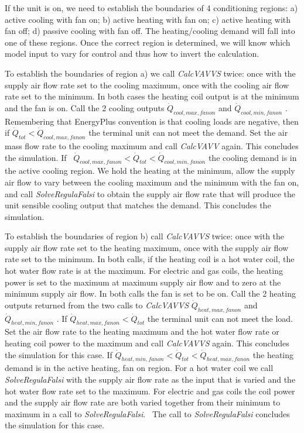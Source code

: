 If the unit is on, we need to establish the boundaries of 4 conditioning regions: a) active cooling with fan on; b) active heating with fan on; c) active heating with fan off; d) passive cooling with fan off. The heating/cooling demand will fall into one of these regions. Once the correct region is determined, we will know which model input to vary for control and thus how to invert the calculation.

To establish the boundaries of region a) we call \emph{CalcVAVVS} twice: once with the supply air flow rate set to the cooling maximum, once with the cooling air flow rate set to the minimum. In both cases the heating coil output is at the minimum and the fan is on. Call the 2 cooling outputs \({\dot Q_{cool,max,fanon}}\) and \({\dot Q_{cool,min,fanon}}\) . Remembering that EnergyPlus convention is that cooling loads are negative, then if \({\dot Q_{tot}} < {\dot Q_{cool,max,fanon}}\) the terminal unit can not meet the demand. Set the air mass flow rate to the cooling maximum and call \emph{CalcVAVV} again. This concludes the simulation. If~ \({\dot Q_{cool,max,fanon}} < {\dot Q_{tot}} < {\dot Q_{cool,min,fanon}}\) the cooling demand is in the active cooling region. We hold the heating at the minimum, allow the supply air flow to vary between the cooling maximum and the minimum with the fan on, and call \emph{SolveRegulaFalsi} to obtain the supply air flow rate that will produce the unit sensible cooling output that matches the demand. This concludes the simulation.

To establish the boundaries of region b) call \emph{CalcVAVVS} twice: once with the supply air flow rate set to the heating maximum, once with the supply air flow rate set to the minimum. In both calls, if the heating coil is a hot water coil, the hot water flow rate is at the maximum. For electric and gas coils, the heating power is set to the maximum at maximum supply air flow and to zero at the minimum supply air flow. In both calls the fan is set to be on. Call the 2 heating outputs returned from the two calls to \emph{CalcVAVVS} \({\dot Q_{heat,max,fanon}}\) and \({\dot Q_{heat,min,fanon}}\) . If \({\dot Q_{heat,max,fanon}} < {\dot Q_{tot}}\) the terminal unit can not meet the load. Set the air flow rate to the heating maximum and the hot water flow rate or heating coil power to the maximum and call \emph{CalcVAVVS} again. This concludes the simulation for this case. If \({\dot Q_{heat,min,fanon}} < {\dot Q_{tot}} < {\dot Q_{heat,max,fanon}}\) the heating demand is in the active heating, fan on region. For a hot water coil we call \emph{SolveRegulaFalsi} with the supply air flow rate as the input that is varied and the hot water flow rate set to the maximum. For electric and gas coils the coil power and the supply air flow rate are both varied together from their minimum to maximum in a call to \emph{SolveRegulaFalsi}.~ The call to \emph{SolveRegulaFalsi} concludes the simulation for this case.

